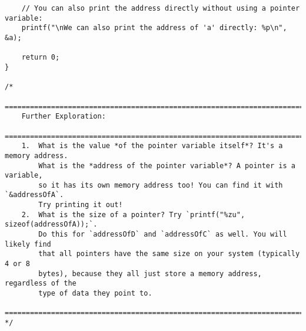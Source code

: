 \documentclass[11pt]{book}
\begin{document}
\begin{verbatim}
    // You can also print the address directly without using a pointer variable:
    printf("\nWe can also print the address of 'a' directly: %p\n", &a);

    return 0;
}

/*
    ================================================================================
    Further Exploration:
    ================================================================================
    1.  What is the value *of the pointer variable itself*? It's a memory address.
        What is the *address of the pointer variable*? A pointer is a variable,
        so it has its own memory address too! You can find it with `&addressOfA`.
        Try printing it out!
    2.  What is the size of a pointer? Try `printf("%zu", sizeof(addressOfA));`.
        Do this for `addressOfD` and `addressOfC` as well. You will likely find
        that all pointers have the same size on your system (typically 4 or 8
        bytes), because they all just store a memory address, regardless of the
        type of data they point to.
    ================================================================================
*/

\end{verbatim}
\clearpage
\end{document}
